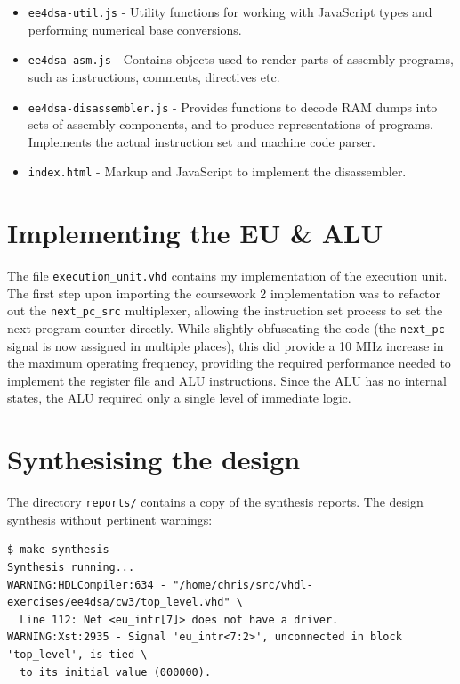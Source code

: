 \documentclass[12pt,a4paper]{article}
\begin{document}
\begin{itemize}
\item \texttt{ee4dsa-util.js} - Utility functions for working with
  JavaScript types and performing numerical base conversions.
\item \texttt{ee4dsa-asm.js} - Contains objects used to render parts
  of assembly programs, such as instructions, comments, directives
  etc.
\item \texttt{ee4dsa-disassembler.js} - Provides functions to decode
  RAM dumps into sets of assembly components, and to produce
  representations of programs. Implements the actual instruction set
  and machine code parser.
\item \texttt{index.html} - Markup and JavaScript to implement the
  disassembler.
\end{itemize}

\section{Implementing the EU \& ALU}

The file \texttt{execution\_unit.vhd} contains my implementation of
the execution unit. The first step upon importing the coursework 2
implementation was to refactor out the \texttt{next\_pc\_src}
multiplexer, allowing the instruction set process to set the next
program counter directly. While slightly obfuscating the code (the
\texttt{next\_pc} signal is now assigned in multiple places), this did
provide a 10 MHz increase in the maximum operating frequency,
providing the required performance needed to implement the register
file and ALU instructions. Since the ALU has no internal states, the
ALU required only a single level of immediate logic.

\section{Synthesising the design}

The directory \texttt{reports/} contains a copy of the synthesis
reports. The design synthesis without pertinent warnings:

\begin{verbatim}
$ make synthesis
Synthesis running...
WARNING:HDLCompiler:634 - "/home/chris/src/vhdl-exercises/ee4dsa/cw3/top_level.vhd" \
  Line 112: Net <eu_intr[7]> does not have a driver.
WARNING:Xst:2935 - Signal 'eu_intr<7:2>', unconnected in block 'top_level', is tied \
  to its initial value (000000).
\end{verbatim}
\end{document}
